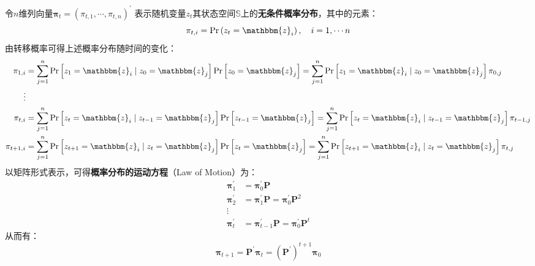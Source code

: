 令$n$维列向量$\boldsymbol{\pi}_t=\left(\pi_{t,1},\cdots,\pi_{t,n}\right)^{\prime}$
表示随机变量$z_t$其状态空间$\mathbb{S}$上的\textbf{无条件概率分布}，其中的元素：
\begin{equation*}
    \pi_{t,i} = \operatorname{Pr}\left(z_t = \mathbbm{z}_i\right), \quad i=1,\cdots n
\end{equation*}
由转移概率可得上述概率分布随时间的变化：
\begin{equation*}
    \begin{aligned}
        \pi_{1, i} &= \sum_{j=1}^n \operatorname{Pr}\left[z_1=\mathbbm{z}_i \mid z_0=\mathbbm{z}_j\right] 
                        \operatorname{Pr}\left[z_0=\mathbbm{z}_j\right] 
                    =  \sum_{j=1}^n \operatorname{Pr}\left[z_1=\mathbbm{z}_i \mid z_0=\mathbbm{z}_j\right]\pi_{0,j}  \\
        \vdots & \\
        \pi_{t, i} &= \sum_{j=1}^n \operatorname{Pr}\left[z_t=\mathbbm{z}_i \mid z_{t-1}=\mathbbm{z}_j\right] 
                        \operatorname{Pr}\left[z_{t-1}=\mathbbm{z}_j\right] 
                    =  \sum_{j=1}^n \operatorname{Pr}\left[z_t=\mathbbm{z}_i \mid z_{t-1}=\mathbbm{z}_j\right]\pi_{t-1,j}  \\
        \pi_{t+1, i} &= \sum_{j=1}^n \operatorname{Pr}\left[z_{t+1}=\mathbbm{z}_i \mid z_t=\mathbbm{z}_j\right] 
                        \operatorname{Pr}\left[z_t=\mathbbm{z}_j\right]
                    =  \sum_{j=1}^n \operatorname{Pr}\left[z_{t+1}=\mathbbm{z}_i \mid z_t=\mathbbm{z}_j\right]\pi_{t,j}
        \end{aligned}
\end{equation*}
以矩阵形式表示，可得\textbf{概率分布的运动方程}（Law of Motion）为：
\begin{equation*}
    \begin{aligned}
        \boldsymbol{\pi}_1^{\prime} &= \boldsymbol{\pi}_0^{\prime}\boldsymbol{P} \\
        \boldsymbol{\pi}_2^{\prime} &= \boldsymbol{\pi}_1^{\prime}\boldsymbol{P} 
            = \boldsymbol{\pi}_0^{\prime}\boldsymbol{P}^2 \\
        \vdots & \\
        \boldsymbol{\pi}_t^{\prime} &= \boldsymbol{\pi}_{t-1}^{\prime}\boldsymbol{P} 
            = \boldsymbol{\pi}_0^{\prime}\boldsymbol{P}^t
    \end{aligned}
\end{equation*}
从而有：
\begin{equation}    \label{eq-markov-pr-motion}
    \boldsymbol{\pi}_{t+1} = \boldsymbol{P}^{\prime}\boldsymbol{\pi}_t 
        = \left(\boldsymbol{P}^{\prime}\right)^{t+1}\boldsymbol{\pi}_0
\end{equation}


